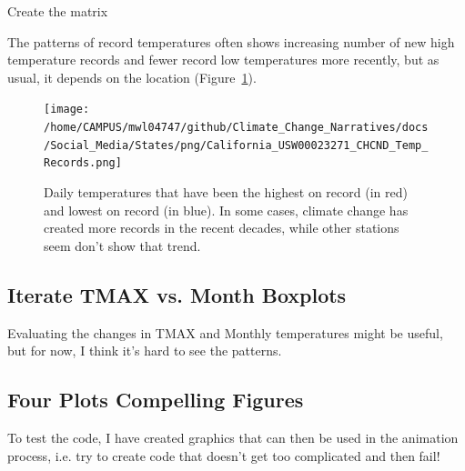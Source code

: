\documentclass{article}
\begin{document}
Create the matrix
\begin{knitrout}
\color{fgcolor}\begin{kframe}


{\ttfamily\noindent\bfseries\color{errorcolor}{\#\# Error in TMAX.mat.noleap[j, year.seq\$Col[year.seq\$Year == i]] <- CHCND.noleap\$TMAX[CHCND.noleap\$Year == : replacement has length zero}}\end{kframe}
\end{knitrout}




The patterns of record temperatures often shows increasing number of new high temperature records  and fewer record low temperatures more recently, but as usual, it depends on the location (Figure~\ref{fig:Records}).
\begin{figure}
\texttt{[image: /home/CAMPUS/mwl04747/github/Climate\_Change\_Narratives/docs/Social\_Media/States/png/California\_USW00023271\_CHCND\_Temp\_Records.png]}
\caption{Daily temperatures that have been the highest on record (in red) and lowest on record (in blue). In some cases, climate change has created more records in the recent decades, while other stations seem don't show that trend.}
\label{fig:Records}
\end{figure}

\subsection{Iterate TMAX vs. Month Boxplots}

Evaluating the changes in TMAX and Monthly temperatures might be useful, but for now, I think it's hard to see the patterns. 




\subsection{Four Plots Compelling Figures}

To test the code, I have created graphics that can then be used in the animation process, i.e. try to create code that doesn't get too complicated and then fail! 

\begin{knitrout}
\color{fgcolor}\begin{kframe}


{\ttfamily\noindent\bfseries\color{errorcolor}{\#\# Error in seq(min(GSOM\$Year), max(GSOM\$Year), by = 2): object 'GSOM' not found}}\end{kframe}
\end{knitrout}
\end{document}
